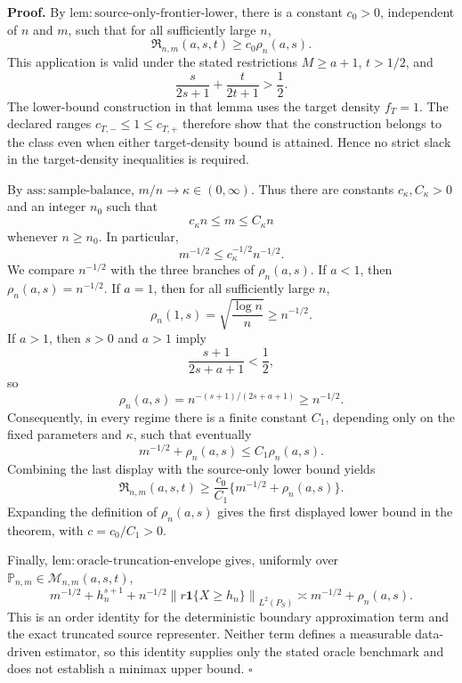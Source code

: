 \textbf{Proof.}
By \(\mathrm{lem:source\text{-}only\text{-}frontier\text{-}lower}\), there is a constant \(c_0>0\), independent of \(n\) and \(m\), such that for all sufficiently large \(n\),
\[
\mathfrak R_{n,m}(a,s,t)\ge c_0\rho_n(a,s).
\]
This application is valid under the stated restrictions \(M\ge a+1\), \(t>1/2\), and
\[
\frac{s}{2s+1}+\frac{t}{2t+1}>\frac12.
\]
The lower-bound construction in that lemma uses the target density \(f_T=1\). The declared ranges \(c_{T,-}\le 1\le c_{T,+}\) therefore show that the construction belongs to the class even when either target-density bound is attained. Hence no strict slack in the target-density inequalities is required.

By \(\mathrm{ass:sample\text{-}balance}\), \(m/n\to\kappa\in(0,\infty)\). Thus there are constants \(c_\kappa,C_\kappa>0\) and an integer \(n_0\) such that
\[
c_\kappa n\le m\le C_\kappa n
\]
whenever \(n\ge n_0\). In particular,
\[
m^{-1/2}\le c_\kappa^{-1/2}n^{-1/2}.
\]
We compare \(n^{-1/2}\) with the three branches of \(\rho_n(a,s)\). If \(a<1\), then \(\rho_n(a,s)=n^{-1/2}\). If \(a=1\), then for all sufficiently large \(n\),
\[
\rho_n(1,s)=\sqrt{\frac{\log n}{n}}\ge n^{-1/2}.
\]
If \(a>1\), then \(s>0\) and \(a>1\) imply
\[
\frac{s+1}{2s+a+1}<\frac12,
\]
so
\[
\rho_n(a,s)=n^{-(s+1)/(2s+a+1)}\ge n^{-1/2}.
\]
Consequently, in every regime there is a finite constant \(C_1\), depending only on the fixed parameters and \(\kappa\), such that eventually
\[
m^{-1/2}+\rho_n(a,s)\le C_1\rho_n(a,s).
\]
Combining the last display with the source-only lower bound yields
\[
\mathfrak R_{n,m}(a,s,t)
\ge \frac{c_0}{C_1}\{m^{-1/2}+\rho_n(a,s)\}.
\]
Expanding the definition of \(\rho_n(a,s)\) gives the first displayed lower bound in the theorem, with \(c=c_0/C_1>0\).

Finally, \(\mathrm{lem:oracle\text{-}truncation\text{-}envelope}\) gives, uniformly over \(\mathbb P_{n,m}\in\mathcal M_{n,m}(a,s,t)\),
\[
m^{-1/2}+h_n^{s+1}+n^{-1/2}
\left\|r\mathbf 1\{X\ge h_n\}\right\|_{L^2(P_S)}
\asymp m^{-1/2}+\rho_n(a,s).
\]
This is an order identity for the deterministic boundary approximation term and the exact truncated source representer. Neither term defines a measurable data-driven estimator, so this identity supplies only the stated oracle benchmark and does not establish a minimax upper bound. \(\square\)
